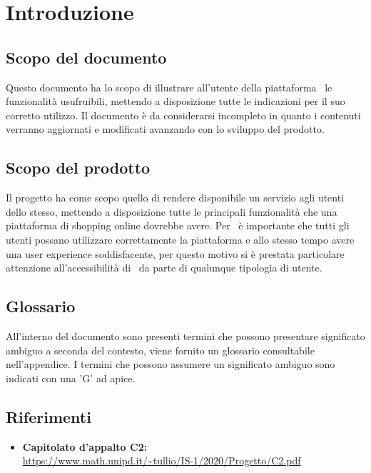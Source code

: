 \section{Introduzione}
\label{Introduzione}
\subsection{Scopo del documento}
Questo documento ha lo scopo di illustrare all'utente della piattaforma \NomeProgetto\ le funzionalità usufruibili, mettendo a disposizione tutte le indicazioni per il suo corretto utilizzo. Il documento è da considerarsi incompleto in quanto i contenuti verranno aggiornati e modificati avanzando con lo sviluppo del prodotto.
\subsection{Scopo del prodotto} 
Il progetto {\NomeProgetto} ha come scopo quello di rendere disponibile un servizio  agli utenti dello stesso, mettendo a disposizione tutte le principali funzionalità che una piattaforma di shopping online dovrebbe avere.
Per \Gruppo\ è importante che tutti gli utenti possano utilizzare correttamente la piattaforma e allo stesso tempo avere una user experience soddisfacente, per questo motivo si è prestata particolare attenzione all'accessibilità di \NomeProgetto\ da parte di qualunque tipologia di utente.
\subsection{Glossario}
All'interno del documento sono presenti termini che possono presentare significato ambiguo a seconda del contesto, viene fornito un glossario consultabile nell'appendice. I termini che possono assumere un significato ambiguo sono indicati con una 'G' ad apice. 
\subsection{Riferimenti}
\begin{itemize}
	\item \textbf{Capitolato d'appalto C2:}\\
	\url{https://www.math.unipd.it/~tullio/IS-1/2020/Progetto/C2.pdf}
\end{itemize}